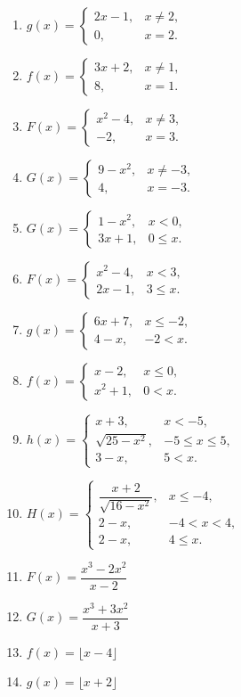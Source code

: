 \documentclass[12pt]{article}
\theoremstyle{remark}
\begin{document}
\begin{enumerate}[resume]
\item $g(x)=\begin{cases}2x-1,&x\ne2,\\0,&x=2.\end{cases}$
\item $f(x)=\begin{cases}3x+2,&x\ne1,\\8,&x=1.\end{cases}$
\item $F(x)=\begin{cases}x^2-4,&x\ne3,\\-2,&x=3.\end{cases}$
\item $G(x)=\begin{cases}9-x^2,&x\ne-3,\\4,&x=-3.\end{cases}$
\item $G(x)=\begin{cases}1-x^2,&x<0,\\3x+1,&0\le x.\end{cases}$
\item $F(x)=\begin{cases}x^2-4,&x<3,\\2x-1,&3\le x.\end{cases}$
\item $g(x)=\begin{cases}6x+7,&x\le-2,\\4-x,&-2<x.\end{cases}$
\item $f(x)=\begin{cases}x-2,&x\le0,\\x^2+1,&0<x.\end{cases}$
\item $h(x)=\begin{cases}x+3,&x<-5,\\\sqrt{25-x^2},&-5\le x\le5,\\3-x,&5<x.\end{cases}$
\item $H(x)=\begin{cases}\dfrac{x+2}{\sqrt{16-x^2}},&x\le-4,\\2-x,&-4<x<4,\\2-x,&4\le x.\end{cases}$
\item $F(x)=\dfrac{x^3-2x^2}{x-2}$
\item $G(x)=\dfrac{x^3+3x^2}{x+3}$
\item $f(x)=\lfloor x-4\rfloor$
\item $g(x)=\lfloor x+2\rfloor$
\end{enumerate}
\end{document}
